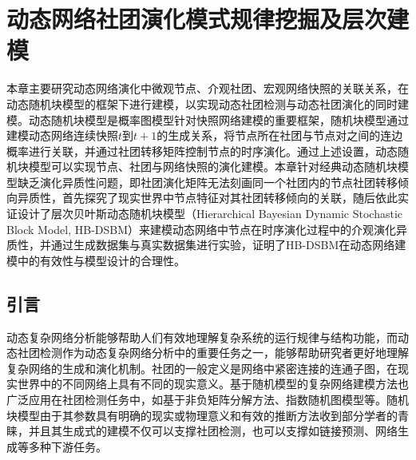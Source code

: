 \baselineskip 20pt

\chapter{动态网络社团演化模式规律挖掘及层次建模} 
\label{chap:3}
本章主要研究动态网络演化中微观节点、介观社团、宏观网络快照的关联关系，在动态随机块模型的框架下进行建模，以实现动态社团检测与动态社团演化的同时建模。动态随机块模型是概率图模型针对快照网络建模的重要框架，随机块模型通过建模动态网络连续快照$t$到$t+1$的生成关系，将节点所在社团与节点对之间的连边概率进行关联，并通过社团转移矩阵控制节点的时序演化。通过上述设置，动态随机块模型可以实现节点、社团与网络快照的演化建模。本章针对经典动态随机块模型缺乏演化异质性问题，即社团演化矩阵无法刻画同一个社团内的节点社团转移倾向异质性，首先探究了现实世界中节点特征对其社团转移倾向的关联，随后依此实证设计了层次贝叶斯动态随机块模型（Hierarchical Bayesian Dynamic Stochastic Block Model, HB-DSBM）来建模动态网络中节点在时序演化过程中的介观演化异质性，并通过生成数据集与真实数据集进行实验，证明了HB-DSBM在动态网络建模中的有效性与模型设计的合理性。
\section{引言}
动态复杂网络分析能够帮助人们有效地理解复杂系统的运行规律与结构功能\cite{papadopoulos2012popularity}，而动态社团检测作为动态复杂网络分析中的重要任务之一，能够帮助研究者更好地理解复杂网络的生成和演化机制\cite{martinet2020robust}。社团的一般定义是网络中紧密连接的连通子图，在现实世界中的不同网络上具有不同的现实意义\cite{jin2021survey}。基于随机模型的复杂网络建模方法也广泛应用在社团检测任务中，如基于非负矩阵分解方法、指数随机图模型等。随机块模型由于其参数具有明确的现实或物理意义和有效的推断方法收到部分学者的青睐，并且其生成式的建模不仅可以支撑社团检测，也可以支撑如链接预测\cite{kumar2024community}、网络生成\cite{dreveton2024exact}等多种下游任务。

